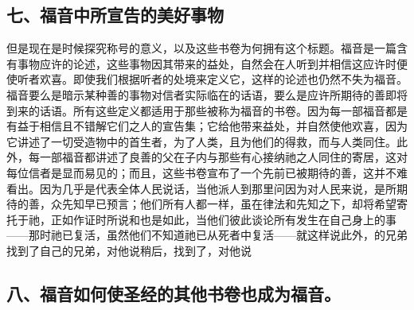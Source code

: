 
\subsection{七、福音中所宣告的美好事物}

但是现在是时候探究称号的意义，以及这些书卷为何拥有这个标题。福音是一篇含有事物应许的论述，这些事物因其带来的益处，自然会在人听到并相信这应许时便使听者欢喜。即使我们根据听者的处境来定义它，这样的论述也仍然不失为福音。福音要么是暗示某种善的事物对信者实际临在的话语，要么是应许所期待的善即将到来的话语。所有这些定义都适用于那些被称为福音的书卷。因为每一部福音都是有益于相信且不错解它们之人的宣告集；它给他带来益处，并自然使他欢喜，因为它讲述了一切受造物中的首生者，为了人类，且为他们的得救，而与人类同住。此外，每一部福音都讲述了良善的父在子内与那些有心接纳祂之人同住的寄居，这对每位信者是显而易见的；而且，这些书卷宣布了一个先前已被期待的善，这并不难看出。因为几乎是代表全体人民说话，当他派人到那里问因为对人民来说，是所期待的善，众先知早已预言；他们所有人都一样，虽在律法和先知之下，却将希望寄托于祂，正如作证时所说和也是如此，当他们彼此谈论所有发生在自己身上的事——那时祂已复活，虽然他们不知道祂已从死者中复活——就这样说此外，的兄弟找到了自己的兄弟，对他说稍后，找到了，对他说\par


\subsection{八、福音如何使圣经的其他书卷也成为福音。}

